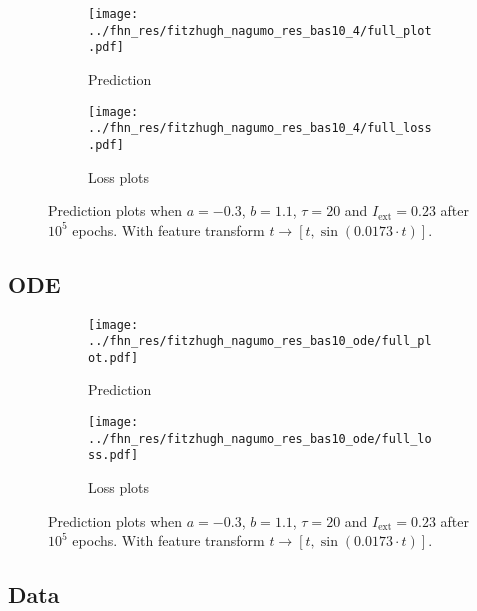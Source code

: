 \documentclass[a4paper]{article}
\begin{document}
\begin{figure}[H]
	\centering 
	\begin{subfigure}[b]{\textwidth}
		\centering
		\texttt{[image: ../fhn\_res/fitzhugh\_nagumo\_res\_bas10\_4/full\_plot.pdf]}
		\caption{Prediction}
		\label{fig:justb08a}
	\end{subfigure}
	\begin{subfigure}[b]{\textwidth}
		\centering
		\texttt{[image: ../fhn\_res/fitzhugh\_nagumo\_res\_bas10\_4/full\_loss.pdf]}
		\caption{Loss plots}
		\label{fig:justb08b}
	\end{subfigure}
	\caption{Prediction plots when $a=-0.3$, $b=1.1$, $\tau=20$ and $ I_{\text{ext}}=0.23$ after $10^5$ epochs. With feature transform $t \rightarrow \left[ t, \sin(0.0173\cdot t) \right] $.}%
\label{plot:justb08}
\end{figure} 	


\subsection{ODE}

\begin{figure}[H]
	\centering 
	\begin{subfigure}[b]{\textwidth}
		\centering
		\texttt{[image: ../fhn\_res/fitzhugh\_nagumo\_res\_bas10\_ode/full\_plot.pdf]}
		\caption{Prediction}
		\label{fig:justb02a}
	\end{subfigure}
	\begin{subfigure}[b]{\textwidth}
		\centering
		\texttt{[image: ../fhn\_res/fitzhugh\_nagumo\_res\_bas10\_ode/full\_loss.pdf]}
		\caption{Loss plots}
		\label{fig:justb02b}
	\end{subfigure}
	\caption{Prediction plots when $a=-0.3$, $b=1.1$, $\tau=20$ and $ I_{\text{ext}}=0.23$ after $10^5$ epochs. With feature transform $t \rightarrow \left[ t, \sin(0.0173\cdot t) \right] $.}%
	\label{plot:justb02}
\end{figure} 	


\subsection{Data}
\end{document}
